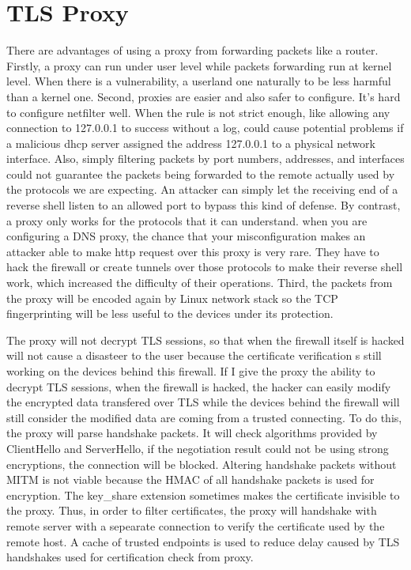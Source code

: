 \documentclass[mscthesis]{usiinfthesis}
\begin{document}
\section{TLS Proxy}

There are advantages of using a proxy from forwarding packets like a router. Firstly, a proxy can run under user level while packets forwarding run at kernel level. When there is a vulnerability, a userland one naturally to be less harmful than a kernel one. Second, proxies are easier and also safer to configure. It's hard to configure netfilter well. When the rule is not strict enough, like allowing any connection to 127.0.0.1 to success without a log, could cause potential problems if a malicious dhcp server assigned the address 127.0.0.1 to a physical network interface. Also, simply filtering packets by port numbers, addresses, and interfaces could not guarantee the packets being forwarded to the remote actually used by the protocols we are expecting. An attacker can simply let the receiving end of a reverse shell listen to an allowed port to bypass this kind of defense. By contrast, a proxy only works for the protocols that it can understand. when you are configuring a DNS proxy, the chance that your misconfiguration makes an attacker able to make http request over this proxy is very rare. They have to hack the firewall or create tunnels over those protocols to make their reverse shell work, which increased the difficulty of their operations. Third, the packets from the proxy will be encoded again by Linux network stack so the TCP fingerprinting will be less useful to the devices under its protection.\par
The proxy will not decrypt TLS sessions, so that when the firewall itself is hacked will not cause a disasteer to the user because the certificate verification s still working on the devices behind this firewall. If I give the proxy the ability to decrypt TLS sessions, when the firewall is hacked, the hacker can easily modify the encrypted data transfered over TLS while the devices behind the firewall will still consider the modified data are coming from a trusted connecting. To do this, the proxy will parse handshake packets. It will check algorithms provided by ClientHello and ServerHello, if the negotiation result could not be using strong encryptions, the connection will be blocked. Altering handshake packets without MITM is not viable because the HMAC of all handshake packets is used for encryption. The key\_share extension sometimes makes the certificate invisible to the proxy. Thus, in order to filter certificates, the proxy will handshake with remote server with a sepearate connection to verify the certificate used by the remote host. A cache of trusted endpoints is used to reduce delay caused by TLS handshakes used for certification check from proxy.\par
\end{document}
